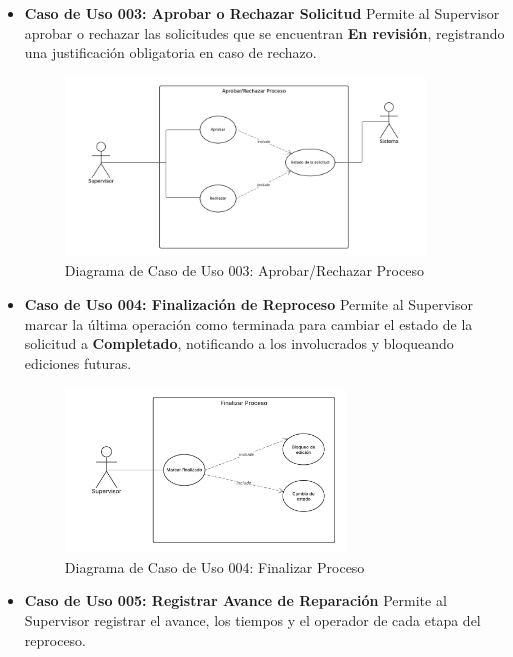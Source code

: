 \documentclass[12pt,letterpaper,spanish]{report}
\begin{document}
\begin{itemize}
    \item \textbf{Caso de Uso 003: Aprobar o Rechazar Solicitud}
    Permite al Supervisor aprobar o rechazar las solicitudes que se encuentran \textbf{En revisión}, registrando una justificación obligatoria en caso de rechazo.

    \begin{figure}[H]
  \centering
  \includegraphics[width=0.9\textwidth]{DIACU03.png}
  \caption{Diagrama de Caso de Uso 003: Aprobar/Rechazar Proceso }\label{d03}
\end{figure}


    \item \textbf{Caso de Uso 004: Finalización de Reproceso}
    Permite al Supervisor marcar la última operación como terminada para cambiar el estado de la solicitud a \textbf{Completado}, notificando a los involucrados y bloqueando ediciones futuras.

    \begin{figure}[H]
  \centering
  \hspace*{-5 cm}
  \includegraphics[width=0.7\textwidth]{DIACU04.png}

  \caption{Diagrama de Caso de Uso 004: Finalizar Proceso}\label{d04}
\end{figure}



    \item \textbf{Caso de Uso 005: Registrar Avance de Reparación} 
    Permite al Supervisor registrar el avance, los tiempos y el operador de cada etapa del reproceso.


\end{itemize}
\end{document}
